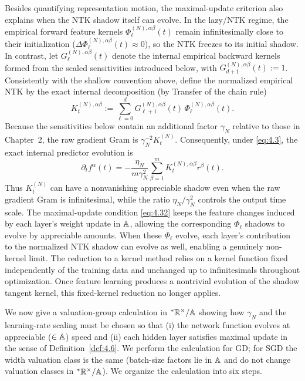 Besides quantifying representation motion, the maximal-update criterion also explains when the NTK shadow itself can evolve. In the lazy/NTK regime, the empirical forward feature kernels $\Phi_\ell^{(N),\alpha\beta}(t)$ remain infinitesimally close to their initialization ($\Delta \Phi_\ell^{(N),\alpha\beta}(t) \approx 0$), so the NTK freezes to its initial shadow. In contrast, let $G_\ell^{(N),\alpha\beta}(t)$ denote the internal empirical backward kernels formed from the scaled sensitivities introduced below, with $G_{d+1}^{(N),\alpha\beta}(t) := 1$. Consistently with the shallow convention above, define the normalized empirical NTK by the exact internal decomposition (by Transfer of the chain rule)
\begin{equation}\label{eq:4.33}
K_t^{(N),\alpha\beta} := \sum_{\ell=0}^d G_{\ell+1}^{(N),\alpha\beta}(t)\,\Phi_\ell^{(N),\alpha\beta}(t).
\end{equation}
Because the sensitivities below contain an additional factor $\gamma_N$ relative to those in Chapter~2, the raw gradient Gram is $\gamma_N^{-2} K_t^{(N)}$. Consequently, under \eqref{eq:4.3}, the exact internal predictor evolution is
\begin{equation}\label{eq:4.34}
\partial_t f^\alpha(t) = -\frac{\eta_N}{m\gamma_N^2}\sum_{\beta=1}^m K_t^{(N),\alpha\beta} r^\beta(t).
\end{equation}
Thus $K_t^{(N)}$ can have a nonvanishing appreciable shadow even when the raw gradient Gram is infinitesimal, while the ratio $\eta_N / \gamma_N^2$ controls the output time scale. The maximal-update condition \eqref{eq:4.32} keeps the feature changes induced by each layer's weight update in $\mathbb{A}$, allowing the corresponding $\Phi_\ell$ shadows to evolve by appreciable amounts. When these $\Phi_\ell$ evolve, each layer's contribution to the normalized NTK shadow can evolve as well, enabling a genuinely non-kernel limit. The reduction to a kernel method relies on a kernel function fixed independently of the training data and unchanged up to infinitesimals throughout optimization. Once feature learning produces a nontrivial evolution of the shadow tangent kernel, this fixed-kernel reduction no longer applies.

We now give a valuation-group calculation in ${}^*\mathbb{R}^\times / \mathbb{A}$ showing how $\gamma_N$ and the learning-rate scaling must be chosen so that (i) the network function evolves at appreciable ($\in \mathbb{A}$) speed and (ii) each hidden layer satisfies maximal update in the sense of Definition~\ref{def:4.6}. We perform the calculation for GD; for SGD the width valuation class is the same (batch-size factors lie in $\mathbb{A}$ and do not change valuation classes in ${}^*\mathbb{R}^\times / \mathbb{A}$). We organize the calculation into six steps.


